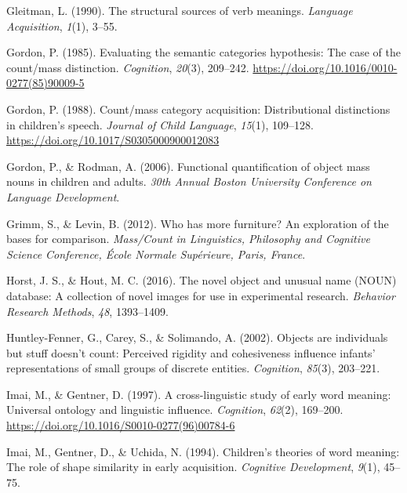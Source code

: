 \documentclass[
  man,floatsintext]{apa6}
\newlength{\cslhangindent}
\newlength{\cslentryspacingunit} %
\newenvironment{CSLReferences}[2] %
 {%
  \setlength{\parindent}{0pt}
  \ifodd #1
  \let\oldpar\par
  \def\par{\hangindent=\cslhangindent\oldpar}
  \fi
  \setlength{\parskip}{#2\cslentryspacingunit}
 }%
 {}
\begin{document}
\begin{CSLReferences}{1}{0}
\leavevmode{}%
Gleitman, L. (1990). The structural sources of verb meanings. \emph{Language Acquisition}, \emph{1}(1), 3--55.

\leavevmode{}%
Gordon, P. (1985). Evaluating the semantic categories hypothesis: {The} case of the count/mass distinction. \emph{Cognition}, \emph{20}(3), 209--242. \url{https://doi.org/10.1016/0010-0277(85)90009-5}

\leavevmode{}%
Gordon, P. (1988). Count/mass category acquisition: Distributional distinctions in children's speech. \emph{Journal of Child Language}, \emph{15}(1), 109--128. \url{https://doi.org/10.1017/S0305000900012083}

\leavevmode{}%
Gordon, P., \& Rodman, A. (2006). Functional quantification of object mass nouns in children and adults. \emph{30th Annual Boston University Conference on Language Development}.

\leavevmode{}%
Grimm, S., \& Levin, B. (2012). Who has more furniture? An exploration of the bases for comparison. \emph{Mass/Count in Linguistics, Philosophy and Cognitive Science Conference, {É}cole Normale Sup{é}rieure, Paris, France}.

\leavevmode{}%
Horst, J. S., \& Hout, M. C. (2016). The novel object and unusual name (NOUN) database: A collection of novel images for use in experimental research. \emph{Behavior Research Methods}, \emph{48}, 1393--1409.

\leavevmode{}%
Huntley-Fenner, G., Carey, S., \& Solimando, A. (2002). Objects are individuals but stuff doesn't count: Perceived rigidity and cohesiveness influence infants' representations of small groups of discrete entities. \emph{Cognition}, \emph{85}(3), 203--221.

\leavevmode{}%
Imai, M., \& Gentner, D. (1997). A cross-linguistic study of early word meaning: Universal ontology and linguistic influence. \emph{Cognition}, \emph{62}(2), 169--200. \url{https://doi.org/10.1016/S0010-0277(96)00784-6}

\leavevmode{}%
Imai, M., Gentner, D., \& Uchida, N. (1994). Children's theories of word meaning: The role of shape similarity in early acquisition. \emph{Cognitive Development}, \emph{9}(1), 45--75.


\end{CSLReferences}
\end{document}
